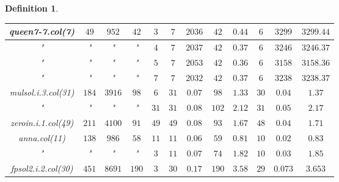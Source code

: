 \documentclass[12pt]{article}
\theoremstyle{slplain}
\newtheorem{defi}{Definition}
\begin{document}
\begin{defi}
\begin{enumerate}
\begin{table}[H]
\begin{center}
\begin{tabular}{|c|c|c|c|c|c|c|c|c|c|c|c|}
\hline
\hline
{\small queen7-7.col(7)} & {\small $49$} & {\small $952$} & {\small $42$} & {\small $3$} & {\small $7$} & {\small $2036$} & {\small $42$} & {\small $0.44$} & {\small $6$} & {\small $3299$} & {\small $3299.44$}\\
\hline
{\small "} & {\small "} & {\small "} & {\small "} & {\small $4$} & {\small $7$} & {\small $2037$} & {\small $42$} & {\small $0.37$} & {\small $6$} & {\small $3246$} & {\small $3246.37$}\\
\hline
{\small "} & {\small "} & {\small "} & {\small "} & {\small $5$} & {\small $7$} & {\small $2053$} & {\small $42$} & {\small $0.36$} & {\small $6$} & {\small $3158$} & {\small $3158.36$}\\
\hline
{\small "} & {\small "} & {\small "} & {\small "} & {\small $7$} & {\small $7$} & {\small $2032$} & {\small $42$} & {\small $0.37$} & {\small $6$} & {\small $3238$} & {\small $3238.37$}\\
\hline
\hline
{\small mulsol.i.3.col(31)} & {\small $184$} & {\small $3916$} & {\small $98$} & {\small $6$} & {\small $31$} & {\small $0.07$} & {\small $98$} & {\small $1.33$} & {\small $30$} & {\small $0.04$} & {\small $1.37$}\\
\hline
{\small "} & {\small "} & {\small "} & {\small "} & {\small $31$} & {\small $31$} & {\small $0.08$} & {\small $102$} & {\small $2.12$} & {\small $31$} & {\small $0.05$} & {\small $2.17$}\\
\hline
\hline
{\small zeroin.i.1.col(49)} & {\small $211$} & {\small $4100$} & {\small $91$} & {\small $49$} & {\small $49$} & {\small $0.08$} & {\small $93$} & {\small $1.67$} & {\small $48$} & {\small $0.04$} & {\small $1.71$}\\
\hline
\hline
{\small anna.col(11)} & {\small $138$} & {\small $986$} & {\small $58$} & {\small $11$} & {\small $11$} & {\small $0.06$} & {\small $59$} & {\small $0.81$} & {\small $10$} & {\small $0.02$} & {\small $0.83$}\\
\hline
{\small "} & {\small "} & {\small "} & {\small "} & {\small $3$} & {\small $11$} & {\small $0.07$} & {\small $74$} & {\small $1.82$} & {\small $10$} & {\small $0.03$} & {\small $1.85$}\\
\hline
\hline
{\small fpsol2.i.2.col(30)} & {\small $451$} & {\small $8691$} & {\small $190$} & {\small $3$} & {\small $30$} & {\small $0.17$} & {\small $190$} & {\small $3.58$} & {\small $29$} & {\small $0.073$} & {\small $3.653$}\\

\end{tabular}
\end{center}
\end{table}
\end{enumerate}
\end{defi}
\end{document}
